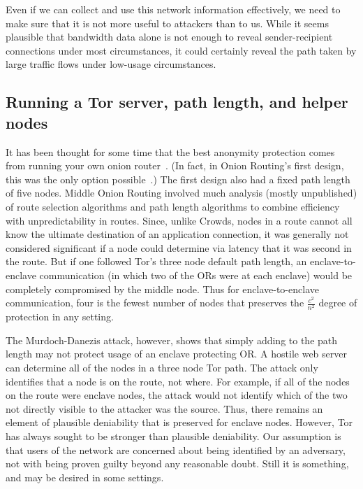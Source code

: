 \documentclass{llncs}
\begin{document}


Even if we can collect and use this network information effectively, we need
to make sure that it is not more useful to attackers than to us.  While it
seems plausible that bandwidth data alone is not enough to reveal
sender-recipient connections under most circumstances, it could certainly
reveal the path taken by large traffic flows under low-usage circumstances.

\subsection{Running a Tor server, path length, and helper nodes}

It has been thought for some time that the best anonymity protection
comes from running your own onion router~\cite{or-pet00,tor-design}.
(In fact, in Onion Routing's first design, this was the only option
possible~\cite{or-ih96}.) The first design also had a fixed path
length of five nodes. Middle Onion Routing involved much analysis
(mostly unpublished) of route selection algorithms and path length
algorithms to combine efficiency with unpredictability in routes.
Since, unlike Crowds, nodes in a route cannot all know the ultimate
destination of an application connection, it was generally not
considered significant if a node could determine via latency that it
was second in the route. But if one followed Tor's three node default
path length, an enclave-to-enclave communication (in which two of the
ORs were at each enclave) would be completely compromised by the
middle node. Thus for enclave-to-enclave communication, four is the fewest
number of nodes that preserves the $\frac{c^2}{n^2}$ degree of protection
in any setting.

The Murdoch-Danezis attack, however, shows that simply adding to the
path length may not protect usage of an enclave protecting OR\@.  A
hostile web server can determine all of the nodes in a three node Tor
path. The attack only identifies that a node is on the route, not
where. For example, if all of the nodes on the route were enclave
nodes, the attack would not identify which of the two not directly
visible to the attacker was the source.  Thus, there remains an
element of plausible deniability that is preserved for enclave nodes.
However, Tor has always sought to be stronger than plausible
deniability. Our assumption is that users of the network are concerned
about being identified by an adversary, not with being proven guilty
beyond any reasonable doubt. Still it is something, and may be desired
in some settings.
\end{document}
